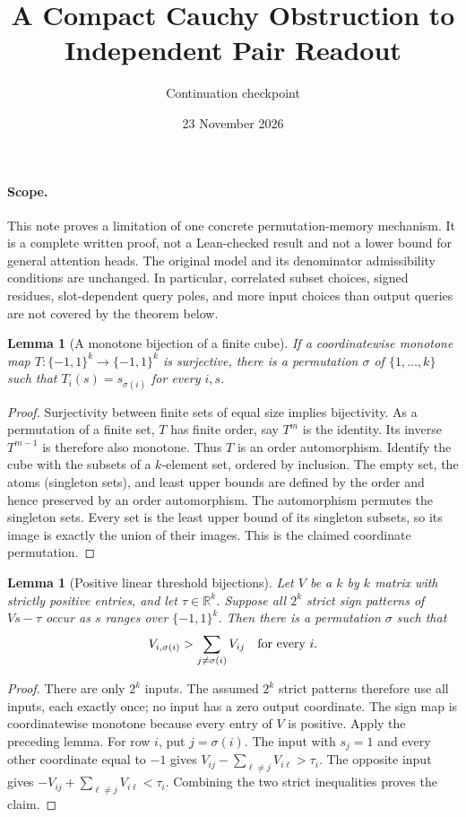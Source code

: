 \documentclass[11pt]{article}
\title{A Compact Cauchy Obstruction to Independent Pair Readout}
\author{Continuation checkpoint}
\date{23 November 2026}
\newtheorem{lemma}[theorem]{Lemma}
\begin{document}
\maketitle

\paragraph{Scope.}
This note proves a limitation of one concrete permutation-memory mechanism.
It is a complete written proof, not a Lean-checked result and not a lower
bound for general attention heads. The original model and its denominator
admissibility conditions are unchanged. In particular, correlated subset
choices, signed residues, slot-dependent query poles, and more input choices
than output queries are not covered by the theorem below.

\begin{lemma}[A monotone bijection of a finite cube]
If a coordinatewise monotone map
$T:\{-1,1\}^k\longrightarrow\{-1,1\}^k$ is surjective, there is a
permutation $\sigma$ of $\{1,\ldots,k\}$ such that
$T_i(s)=s_{\sigma(i)}$ for every $i,s$.
\end{lemma}
\begin{proof}
Surjectivity between finite sets of equal size implies bijectivity.
As a permutation of a finite set, $T$ has finite order, say $T^m$ is the
identity. Its inverse $T^{m-1}$ is therefore also monotone. Thus $T$ is an
order automorphism. Identify the cube with the subsets of a $k$-element set,
ordered by inclusion. The empty set, the atoms (singleton sets), and least
upper bounds are defined by the order and hence preserved by an order
automorphism. The automorphism permutes the singleton sets. Every set is
the least upper bound of its singleton subsets, so its image is exactly the
union of their images. This is the claimed coordinate permutation.
\end{proof}

\begin{lemma}[Positive linear threshold bijections]
Let $V$ be a $k$ by $k$ matrix with strictly positive entries, and let
$\tau\in\mathbb R^k$. Suppose all $2^k$ strict sign patterns of
$Vs-\tau$ occur as $s$ ranges over $\{-1,1\}^k$. Then there is a
permutation $\sigma$ such that
\[
 V_{i,\sigma(i)}>\sum_{j\ne\sigma(i)}V_{ij}
 \quad\hbox{for every }i.
\]
\end{lemma}
\begin{proof}
There are only $2^k$ inputs. The assumed $2^k$ strict patterns therefore
use all inputs, each exactly once; no input has a zero output coordinate.
The sign map is coordinatewise monotone because every entry of $V$ is
positive. Apply the preceding lemma. For row $i$, put $j=\sigma(i)$.
The input with $s_j=1$ and every other coordinate equal to $-1$ gives
$V_{ij}-\sum_{\ell\ne j}V_{i\ell}>\tau_i$. The opposite input gives
$-V_{ij}+\sum_{\ell\ne j}V_{i\ell}<\tau_i$.
Combining the two strict inequalities proves the claim.
\end{proof}
\end{document}
